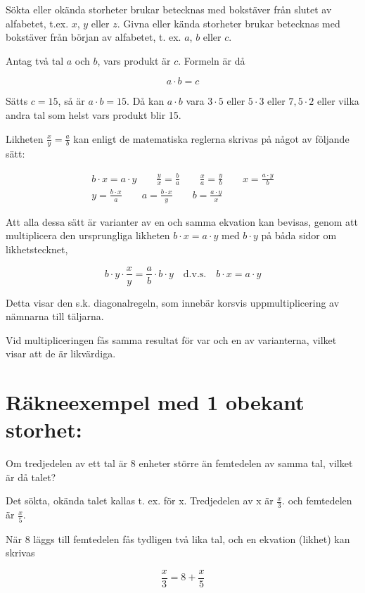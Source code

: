 Sökta eller okända storheter brukar betecknas med bokstäver från slutet av
alfabetet, t.ex. $x$, $y$ eller $z$. Givna eller kända storheter brukar betecknas med
bokstäver från början av alfabetet, t. ex. $a$, $b$ eller $c$.

Antag två tal $a$ och $b$, vars produkt är $c$.
Formeln är då

$$a \cdot b = c$$

Sätts \(c = 15\), så är \(a \cdot b = 15\). Då kan \(a \cdot b\) vara \(3 \cdot
5\) eller \(5 \cdot 3\) eller \(7,5 \cdot 2\) eller vilka andra tal som helst
vars produkt blir 15.

Likheten \(\frac{x}{y} = \frac{a}{b}\) kan enligt de matematiska reglerna
skrivas på något av följande sätt:

\begin{gather*}
b \cdot x = a \cdot y \qquad
\frac{y}{x} = \frac{b}{a} \qquad
\frac{x}{a} = \frac{y}{b} \qquad
x = \frac{a \cdot y}{b} \\
y = \frac{b \cdot x}{a} \qquad
a = \frac{b \cdot x}{y} \qquad
b = \frac{a \cdot y}{x}
\end{gather*}

Att alla dessa sätt är varianter av en och samma ekvation kan bevisas, genom att
multiplicera den ursprungliga likheten \(b \cdot x = a \cdot y\) med \(b \cdot
y\) på båda sidor om likhetstecknet,

\[
b \cdot y \cdot \frac{x}{y} = \frac{a}{b} \cdot b \cdot y \quad \text{d.v.s.}
\quad b \cdot x = a \cdot y
\]

Detta visar den s.k. diagonalregeln, som innebär korsvis uppmultiplicering av
nämnarna till täljarna.

Vid multipliceringen fås samma resultat för var och en av varianterna, vilket
visar att de är likvärdiga.

\section{Räkneexempel med 1 obekant storhet:}

Om tredjedelen av ett tal är 8 enheter större än femtedelen av samma tal, vilket
är då talet?

Det sökta, okända talet kallas t. ex. för x. Tredjedelen av x är
\(\frac{x}{3}\). och femtedelen är \(\frac{x}{5}\).

När 8 läggs till femtedelen fås tydligen två lika tal, och en ekvation (likhet)
kan skrivas

\[\frac{x}{3}=8 + \frac{x}{5}\]

